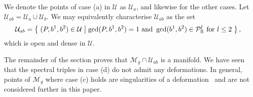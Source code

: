 \documentclass{article}
\begin{document}
\begin{defn}\label{def:subsets U}
We denote the points of case (a) in $\mathcal{U}$ as $\mathcal{U}_{a}$, and likewise for the other cases. Let $\mathcal{U}_{ab} = \mathcal{U}_{a}\cup \mathcal{U}_{b}$. We may equivalently characterise $\mathcal{U}_{ab}$ as the set
\[
\mathcal{U}_{ab} = \left\{\;  (P,b^1,b^2) \in \mathcal{U}  \;\middle|\;  \gcd(P,b^1,b^2) = 1 \text{ and } \gcd(b^1,b^2) \in \mathcal{P}^l_{\mathbb{R}} \text{ for } l \leq 2  \;\right\},
\]
which is open and dense in $\mathcal{U}$.
\end{defn}


The remainder of the section proves that $\mathcal{M}_g \cap \mathcal{U}_{ab}$ is a manifold. We have seen that the spectral triples in case (d) do not admit any deformations. In general, points of $\mathcal{M}_g$ where case (c) holds are singularities of a deformation~\cite{Schmidt2016} and are not considered further in this paper.

\end{document}
